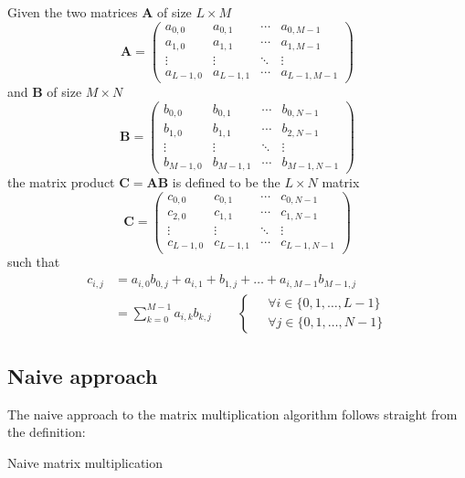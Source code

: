 \documentclass[11pt]{article}
\begin{document}
Given the two matrices $\mathbf{A}$ of size $L \times M$ \[ \mathbf{A} = \begin{pmatrix}
    a_{0,0} & a_{0,1} & \cdots & a_{0,M-1} \\
    a_{1,0} & a_{1,1} & \cdots & a_{1,M-1} \\
    \vdots  & \vdots  & \ddots & \vdots  \\
    a_{L-1,0} & a_{L-1,1} & \cdots & a_{L-1,M-1} 
\end{pmatrix} \] and $\mathbf{B}$ of size $M \times N$ \[ \mathbf{B} = \begin{pmatrix}
    b_{0,0} & b_{0,1} & \cdots & b_{0,N-1} \\
    b_{1,0} & b_{1,1} & \cdots & b_{2,N-1} \\
    \vdots  & \vdots  & \ddots & \vdots  \\
    b_{M-1,0} & b_{M-1,1} & \cdots & b_{M-1,N-1} 
\end{pmatrix} \] the matrix product $\mathbf{C} = \mathbf{A} \mathbf{B}$ is defined to be the $L \times N$ matrix \[ \mathbf{C} = \begin{pmatrix}
    c_{0,0} & c_{0,1} & \cdots & c_{0,N-1} \\
    c_{2,0} & c_{1,1} & \cdots & c_{1,N-1} \\
    \vdots  & \vdots  & \ddots & \vdots  \\
    c_{L-1,0} & c_{L-1,1} & \cdots & c_{L-1,N-1} 
\end{pmatrix} \] such that \begin{align*}
    c_{i, j} &= a_{i, 0} b_{0, j} + a_{i, 1} + b_{1, j} + \dots + a_{i, M-1} b_{M-1, j} \\
    &= \sum_{k = 0}^{M-1} a_{i, k} b_{k, j} \qquad \left\{ \;\begin{aligned}
        &\forall i \in \{0, 1, \dots, L-1\}\\
        &\forall j \in \{0, 1, \dots, N-1\}
    \end{aligned} \right.
\end{align*}

\subsection{Naive approach}\label{naive}
The naive approach to the matrix multiplication algorithm follows straight from the definition:

\begin{algorithm}[H]
    \caption{Naive matrix multiplication}
    \label{alg:naiveMM}
    \DontPrintSemicolon
\end{algorithm}
\end{document}
